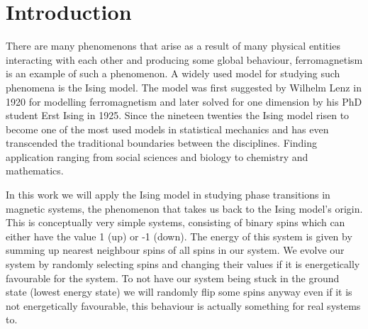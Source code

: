 \section{Introduction}
There are many phenomenons that arise as a result of many physical entities
interacting with each other and producing some global behaviour,
ferromagnetism is an example of such a phenomenon. A widely used model for studying
such phenomena is the Ising model.
The model was first suggested by Wilhelm Lenz in 1920 for modelling ferromagnetism and later solved
for one dimension by his PhD student Erst Ising in 1925. Since the nineteen
twenties the Ising model risen to become one of the most used models in
statistical mechanics and has even
transcended the traditional boundaries between the disciplines. Finding 
application ranging from social sciences and biology to chemistry and
mathematics.     

In this work we will apply the Ising model in studying phase
transitions in magnetic systems, the phenomenon that takes us
back to the Ising model's origin.  This is conceptually very simple systems,
consisting of binary spins which can either have the value 1 (up) or -1 (down).
The energy of this system is given by summing up nearest neighbour spins of all
spins in our system. We evolve our system by randomly selecting spins and
changing their values if it is energetically favourable for the system. To not
have our system being stuck in the ground state (lowest energy state) we will randomly flip some spins
anyway even if it is not energetically favourable, this behaviour is actually
something for real systems to. 


